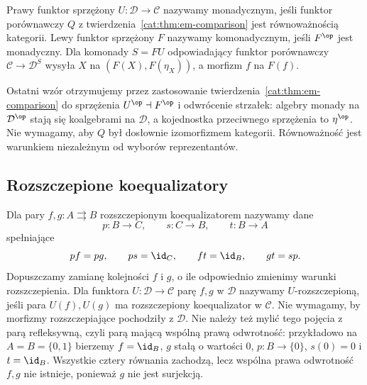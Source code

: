 \begin{definicja}\label{cat:def:monadicity}
Prawy funktor sprzężony $U:\mathcal D\to\mathcal C$ nazywamy monadycznym, jeśli funktor porównawczy $Q$ z twierdzenia~\ref{cat:thm:em-comparison} jest równoważnością kategorii. Lewy funktor sprzężony $F$ nazywamy komonadycznym, jeśli $F^{\op}$ jest monadyczny. Dla komonady $S=FU$ odpowiadający funktor porównawczy $\mathcal C\to\mathcal D^S$ wysyła $X$ na $(F(X),F(\eta_X))$, a morfizm $f$ na $F(f)$.
\end{definicja}
Ostatni wzór otrzymujemy przez zastosowanie twierdzenia~\ref{cat:thm:em-comparison} do sprzężenia $U^{\op}\dashv F^{\op}$ i odwrócenie strzałek: algebry monady na $\mathcal D^{\op}$ stają się koalgebrami na $\mathcal D$, a kojednostka przeciwnego sprzężenia to $\eta^{\op}$. Nie wymagamy, aby $Q$ był dosłownie izomorfizmem kategorii. Równoważność jest warunkiem niezależnym od wyborów reprezentantów.


\subsection{Rozszczepione koequalizatory}

\begin{definicja}\label{cat:def:split-coequalizer}
Dla pary $f,g:A\rightrightarrows B$ rozszczepionym koequalizatorem nazywamy dane
\[
 p:B\to C,\qquad s:C\to B,\qquad t:B\to A
\]
spełniające
\[
 pf=pg,\qquad ps=\id_C,\qquad ft=\id_B,\qquad gt=sp.
\]
Dopuszczamy zamianę kolejności $f$ i $g$, o ile odpowiednio zmienimy warunki rozszczepienia. Dla funktora $U:\mathcal D\to\mathcal C$ parę $f,g$ w $\mathcal D$ nazywamy $U$-rozszczepioną, jeśli para $U(f),U(g)$ ma rozszczepiony koequalizator w $\mathcal C$. Nie wymagamy, by morfizmy rozszczepiające pochodziły z $\mathcal D$. Nie należy też mylić tego pojęcia z parą refleksywną, czyli parą mającą wspólną prawą odwrotność: przykładowo na $A=B=\{0,1\}$ bierzemy $f=\id_B$, $g$ stałą o wartości $0$, $p:B\to\{0\}$, $s(0)=0$ i $t=\id_B$. Wszystkie cztery równania zachodzą, lecz wspólna prawa odwrotność $f,g$ nie istnieje, ponieważ $g$ nie jest surjekcją.
\end{definicja}

